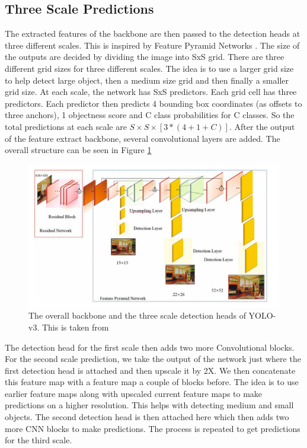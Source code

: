 \documentclass[10pt,twocolumn,letterpaper]{article}
\begin{document}
\subsection{Three Scale Predictions}
The extracted features of the backbone are then passed to the detection heads at three different scales. This is inspired by Feature Pyramid Networks \cite{Feature_pyramids}. The size of the outputs are decided by dividing the image into SxS grid. There are three different grid sizes for three different scales. The idea is to use a larger grid size to help detect large object, then a medium size grid and then finally a smaller grid size. At each scale, the network has SxS predictors. Each grid cell has three predictors. Each predictor then predicts 4 bounding box coordinates (as offsets to three anchors), 1 objectness score and C class probabilities for C classes. So the total predictions at each scale are $S\times S\times [3*(4+1+C)]$. 
After the output of the feature extract backbone, several convolutional layers are added. The overall structure can be seen in Figure \ref{fig:detection_head}

\begin{figure}[t]
	\begin{center}
		\includegraphics[width=\textwidth]{detection_heads.png}
	\end{center}
	\caption{The overall backbone and the three scale detection heads of YOLO-v3. This is taken from \cite{face_detection_yolo}}
	\label{fig:detection_head}
\end{figure}

The detection head for the first scale then adds two more Convolutional blocks. For the second scale prediction, we take the output of the network just where the first detection head is attached and then upscale it by 2X. We then concatenate this feature map with a feature map a couple of blocks before. The idea is to use earlier feature maps along with upscaled current feature maps to make predictions on a higher resolution. This helps with detecting medium and small objects. The second detection head is then attached here which then adds two more CNN blocks to make predictions. The process is repeated to get predictions for the third scale. 
\end{document}
